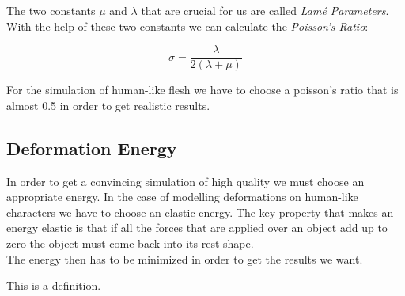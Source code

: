 The two constants $\mu$ and $\lambda$ that are crucial for us are called \textit{Lamé Parameters}. With the help of these two constants we can calculate the \textit{Poisson's Ratio}:

\[ \sigma =  \frac{\lambda}{2(\lambda + \mu)}  \]


For the simulation of human-like flesh we have to choose a poisson's ratio that is almost 0.5 in order to get realistic results.
\\ 




\subsection{Deformation Energy}
In order to get a convincing simulation of high quality we must choose an appropriate energy. In the case of modelling deformations on human-like characters we have to choose an elastic energy. The key property that makes an energy elastic is that if all the forces that are applied over an object add up to zero the object must come back into its rest shape.
\\
The energy then has to be minimized in order to get the results we want.

\begin{definition}
  This is a definition.
\end{definition}







